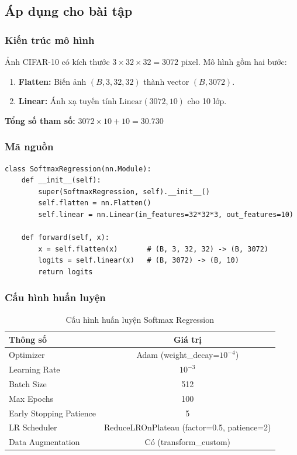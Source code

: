 \documentclass[a4paper]{article}
\theoremstyle{definition}
\begin{document}
\subsection{Áp dụng cho bài tập}

\subsubsection{Kiến trúc mô hình}
Ảnh CIFAR-10 có kích thước $3 \times 32 \times 32 = 3072$ pixel. Mô hình gồm hai bước:
\begin{enumerate}
	\item \textbf{Flatten:} Biến ảnh $(B, 3, 32, 32)$ thành vector $(B, 3072)$.
	\item \textbf{Linear:} Ánh xạ tuyến tính $\text{Linear}(3072, 10)$ cho 10 lớp.
\end{enumerate}

\textbf{Tổng số tham số:} $3072 \times 10 + 10 = 30.730$

\subsubsection{Mã nguồn}
\begin{verbatim}
class SoftmaxRegression(nn.Module):
    def __init__(self):
        super(SoftmaxRegression, self).__init__()
        self.flatten = nn.Flatten()
        self.linear = nn.Linear(in_features=32*32*3, out_features=10)

    def forward(self, x):
        x = self.flatten(x)       # (B, 3, 32, 32) -> (B, 3072)
        logits = self.linear(x)   # (B, 3072) -> (B, 10)
        return logits
\end{verbatim}

\subsubsection{Cấu hình huấn luyện}
\begin{table}[H]
	\centering
	\caption{Cấu hình huấn luyện Softmax Regression}
	\begin{tabular}{|l|c|}
		\hline
		\textbf{Thông số}          & \textbf{Giá trị} \\ \hline
		Optimizer                  & Adam (weight\_decay=$10^{-4}$) \\ \hline
		Learning Rate              & $10^{-3}$ \\ \hline
		Batch Size                 & 512 \\ \hline
		Max Epochs                 & 100 \\ \hline
		Early Stopping Patience    & 5 \\ \hline
		LR Scheduler               & ReduceLROnPlateau (factor=0.5, patience=2) \\ \hline
		Data Augmentation          & Có (transform\_custom) \\ \hline
	\end{tabular}
	\label{tab:softmax-config}
\end{table}
\end{document}
